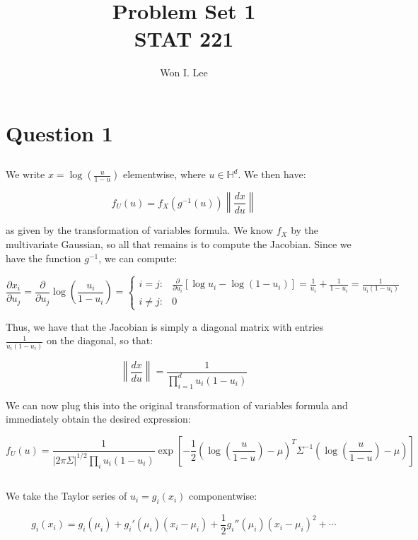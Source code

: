 \documentclass[psamsfonts]{amsart}
\title{Problem Set 1 \\ STAT 221}
\author{Won I. Lee}
\theoremstyle{definition}
\theoremstyle{remark}
\numberwithin{equation}{section}
\begin{document}
	
\maketitle

\section{Question 1}

\subsection{} We write $x = \log\left( \frac{u}{1-u}\right)$ elementwise, where $u \in \mathbb{H}^d$. We then have:

$$f_U(u) = f_X(g^{-1}(u)) \left\|\frac{dx}{du}\right\|$$

as given by the transformation of variables formula. We know $f_X$ by the multivariate Gaussian, so all that remains is to compute the Jacobian. Since we have the function $g^{-1}$, we can compute:

$$\frac{\partial x_i}{\partial u_j} = \frac{\partial}{\partial u_j} \log \left(\frac{u_i}{1-u_i}\right) = \left\{ \begin{array}{lc} i=j : & \frac{\partial}{\partial u_i} [\log u_i - \log(1-u_i)] = \frac{1}{u_i} + \frac{1}{1-u_i} = \frac{1}{u_i(1-u_i)} \\ i\neq j : & 0 \end{array} \right.$$

Thus, we have that the Jacobian is simply a diagonal matrix with entries $\frac{1}{u_i(1-u_i)}$ on the diagonal, so that:

$$\left\|\frac{dx}{du}\right\| = \frac{1}{\prod_{i=1}^d u_i(1-u_i)}$$

We can now plug this into the original transformation of variables formula and immediately obtain the desired expression:

$$f_U(u) = \frac{1}{|2\pi\Sigma|^{1/2} \prod_i u_i (1- u_i)} \exp\left[-\frac{1}{2}\left(\log\left(\frac{u}{1-u}\right) - \mu \right)^T \Sigma^{-1} \left(\log\left(\frac{u}{1-u}\right) - \mu \right) \right]$$

\subsection{} We take the Taylor series of $u_i = g_i(x_i)$ componentwise:

$$g_i(x_i) = g_i(\mu_i) + g_i'(\mu_i) (x_i-\mu_i) + \frac{1}{2} g_i''(\mu_i) (x_i-\mu_i)^2 + \cdots$$
\end{document}
